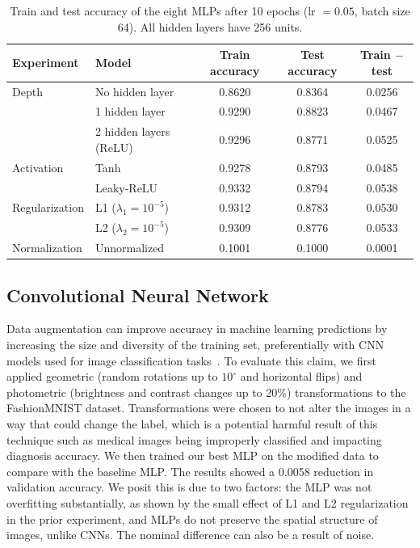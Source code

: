 \documentclass[11pt]{article}
\begin{document}
\begin{table}[t]
  \centering
  \caption{Train and test accuracy of the eight MLPs after 10 epochs
           (lr $=0.05$, batch size 64). All hidden layers have 256 units.}
  \label{tab:mlp-main}
  \begin{tabular}{llccc}
    \toprule
    Experiment & Model & Train accuracy & Test accuracy & Train $-$ test \\
    \midrule
    Depth          & No hidden layer          & 0.8620 & 0.8364 & 0.0256 \\
                   & 1 hidden layer           & 0.9290 & 0.8823 & 0.0467 \\
                   & 2 hidden layers (ReLU)   & 0.9296 & 0.8771 & 0.0525 \\
    \midrule
    Activation     & Tanh                     & 0.9278 & 0.8793 & 0.0485 \\
                   & Leaky-ReLU               & 0.9332 & 0.8794 & 0.0538 \\
    \midrule
    Regularization & L1 ($\lambda_1=10^{-5}$) & 0.9312 & 0.8783 & 0.0530 \\
                   & L2 ($\lambda_2=10^{-5}$) & 0.9309 & 0.8776 & 0.0533 \\
    \midrule
    Normalization  & Unnormalized             & 0.1001 & 0.1000 & 0.0001 \\
    \bottomrule
  \end{tabular}
\end{table}

\subsection{Convolutional Neural Network}
Data augmentation can improve accuracy in machine learning predictions by increasing the size and 
diversity of the training set, preferentially with CNN models used for image classification tasks~\cite{10932445}. 
To evaluate this claim, we first applied geometric (random rotations up to $10^\circ$ and horizontal flips)
and photometric (brightness and contrast changes up to 20\%) transformations to the FashionMNIST dataset. Transformations were chosen 
to not alter the images in a way that could change the label, which is a potential harmful 
result of this technique such as medical images being improperly classified and impacting 
diagnosis accuracy. We then trained our best MLP on the modified data to compare with the 
baseline MLP. The results showed a 0.0058 reduction in validation accuracy. We posit this is due to 
two factors: the MLP was not overfitting substantially, as shown by the small effect of L1 and L2 
regularization in the prior experiment, and MLPs do not preserve the spatial structure of images, unlike CNNs.
The nominal difference can also be a result of noise.
\end{document}

